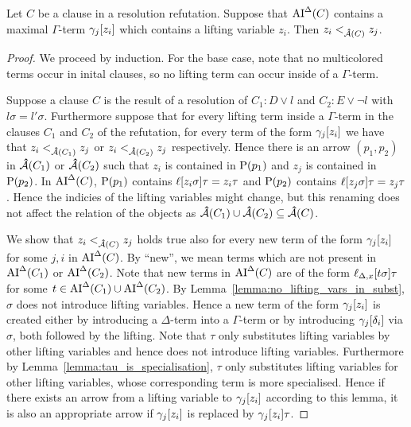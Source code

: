\documentclass[,%
	paper=a4,%
	DIV10, %
	twoside=false,%
	liststotoc,
	bibtotoc,
	draft=false,%
	numbers=noendperiod
]{scrartcl}
\begin{document}
\begin{conj}
	Let $C$ be a clause in a resolution refutation. 
	Suppose that $\operatorname{AI}^\Delta(C)$ contains a maximal $\Gamma$-term $\gamma_j[z_i]$ which contains a lifting variable $z_i$. %
	Then $z_i <_{\operatorname{{\mathcal{\bm{\hat}A}}}(C)} z_j$.
\end{conj}
\begin{proof}
	We proceed by induction.
	For the base case, note that no multicolored terms occur in inital clauses, so no lifting term can occur inside of a $\Gamma$-term.

	\newcommand{\oldgam}{\bm\tilde\gamma_{j\bm'}} 
	\newcommand{\newgam}{\gamma_j} %

	Suppose a clause $C$ is the result of a resolution of $C_1: D \lor l$ and $C_2: E \lor \lnot l$ with $l\sigma = l'\sigma$.
	Furthermore suppose that for every lifting term inside a $\Gamma$-term in the clauses $C_1$ and $C_2$ of the refutation, for every term of the form $\gamma_j[z_i]$ we have that $z_i <_{\operatorname{{\mathcal{\bm{\hat}A}}}(C_1)} z_j$ or $z_i <_{\operatorname{{\mathcal{\bm{\hat}A}}}(C_2)} z_j$ respectively. Hence there is an arrow $(p_1, p_2)$ in $\operatorname{{\mathcal{\bm{\hat}A}}}(C_1)$ or $\operatorname{{\mathcal{\bm{\hat}A}}}(C_2)$ such that $z_i$ is contained in $\operatorname{{\operatorname P}}(p_1)$ and $z_j$ is contained in $\operatorname{{\operatorname P}}(p_2)$.
	In $\operatorname{AI}^\Delta(C)$, $\operatorname{{\operatorname P}}(p_1)$ contains $\ell[z_i\sigma]\tau = z_i\tau$ and $\operatorname{{\operatorname P}}(p_2)$ contains $\ell[z_j\sigma]\tau = z_j\tau$.
	Hence the indicies of the lifting variables might change, but this renaming does not affect the relation of the objects as $\operatorname{{\mathcal{\bm{\hat}A}}}(C_1) \cup \operatorname{{\mathcal{\bm{\hat}A}}}(C_2) \subseteq \operatorname{{\mathcal{\bm{\hat}A}}}(C)$.


	We show that $z_i <_{\operatorname{{\mathcal{\bm{\hat}A}}}(C)} z_j $ holds true also for every new term of the form $\newgam\occ{z_i}$ for some $j, i$ in $\operatorname{AI}^\Delta(C)$. By ``new'', we mean terms which are not present in $\operatorname{AI}^\Delta(C_1)$ or $\operatorname{AI}^\Delta(C_2)$.
	Note that new terms in $\operatorname{AI}^\Delta(C)$ are of the form $\ell_{\Delta,x}[t\sigma]\tau$ for some $t \in \operatorname{AI}^\Delta(C_1) \cup \operatorname{AI}^\Delta(C_2)$.
	By Lemma~\ref{lemma:no_lifting_vars_in_subst}, $\sigma$ does not introduce lifting variables.
	Hence a new term of the form $\newgam\occ{z_i}$ is created either by introducing a $\Delta$-term into a $\Gamma$-term or by introducing $\newgam\occ{\delta_i}$ via $\sigma$, both followed by the lifting. 
	Note that $\tau$ only substitutes lifting variables by other lifting variables and hence does not introduce lifting variables. Furthermore by Lemma~\ref{lemma:tau_is_specialisation}, $\tau$ only substitutes lifting variables for other lifting variables, whose corresponding term is more specialised. Hence if there exists an arrow from a lifting variable to $\newgam\occ{z_i}$ according to this lemma, it is also an appropriate arrow if $\newgam\occ{z_i}$ is replaced by $\newgam\occ{z_i}\tau$.



\end{proof}
\end{document}
